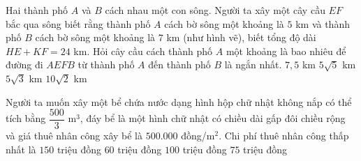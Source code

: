\begin{ex}%
\hfill
\begin{center}
\end{center}
Hai thành phố $A$ và $B$ cách nhau một con sông. Người ta xây một cây cầu $EF$ bắc qua sông biết rằng thành phố $A$ cách bờ sông một khoảng là $5$ km và thành phố $B$ cách bờ sông một khoảng là $7$ km (như hình vẽ), biết tổng độ dài $HE+KF=24$ km. Hỏi cây cầu cách thành phố $A$ một khoảng là bao nhiêu để đường đi $AEFB$ từ thành phố $A$ đến thành phố $B$ là ngắn nhất.
\choice
{$7,5$ km}
{\True $5\sqrt{5}$ km}
{$5\sqrt{3}$ km}
{$10\sqrt{2}$ km}
\end{ex}
\begin{ex}%
Người ta muốn xây một bể chứa nước dạng hình hộp chữ nhật không nắp có thể tích bằng $\dfrac{500}{3}$ m$^{3}$, đáy bể là một hình chữ nhật có chiều dài gấp đôi chiều rộng và giá thuê nhân công xây bể là $500.000$ đồng/m$^{2}$. Chi phí thuê nhân công thấp nhất là
\choice
{$150$ triệu đồng}
{$60$ triệu đồng}
{$100$ triệu đồng}
{\True $75$ triệu đồng}
\end{ex}
